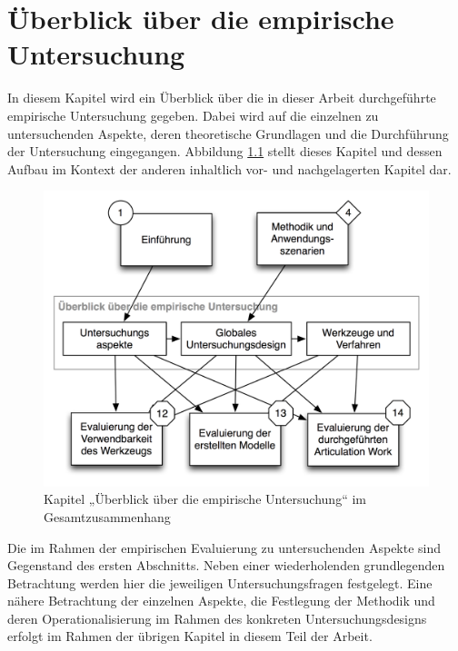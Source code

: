 

\chapter{Überblick über die empirische Untersuchung}
\label{cha:eval_ueberblick}

In diesem Kapitel wird ein Überblick über die in dieser Arbeit durchgeführte empirische Untersuchung gegeben. Dabei wird auf die einzelnen zu untersuchenden Aspekte, deren theoretische Grundlagen und die Durchführung der Untersuchung eingegangen. Abbildung \ref{fig:img_Kontextgrafiken_k11} stellt dieses Kapitel und dessen Aufbau im Kontext der anderen inhaltlich vor- und nachgelagerten Kapitel dar.


\begin{figure}[htbp]
	\centering
		\includegraphics[scale=0.6]{img/Kontextgrafiken/k11.png}
	\caption{Kapitel „Überblick über die empirische Untersuchung“ im Gesamtzusammenhang}
	\label{fig:img_Kontextgrafiken_k11}
\end{figure}

Die im Rahmen der empirischen Evaluierung zu untersuchenden Aspekte sind Gegenstand des ersten Abschnitts. Neben einer wiederholenden grundlegenden Betrachtung werden hier die jeweiligen Untersuchungsfragen festgelegt. Eine nähere Betrachtung der einzelnen Aspekte, die Festlegung der Methodik und deren Operationalisierung im Rahmen des konkreten Untersuchungsdesigns erfolgt im Rahmen der übrigen Kapitel in diesem Teil der Arbeit.

